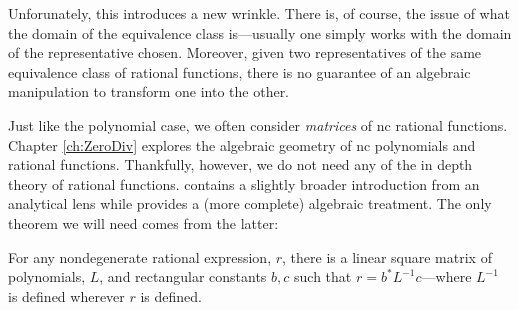 Unforunately, this introduces a new wrinkle. There is, of course, the issue of
what the domain of the equivalence class is---usually one simply works with the
domain of the representative chosen. Moreover, given two representatives of the
same equivalence class of rational functions, there is no guarantee of an
algebraic manipulation to transform one into the other.

Just like the polynomial case, we often consider \emph{matrices} of nc rational
functions. Chapter \ref{ch:ZeroDiv} explores the algebraic geometry of nc
polynomials and rational functions. Thankfully, however, we do not
need any of the in depth theory of rational functions. \cite{heltonFree2013}
contains a slightly broader introduction from an analytical lens while \cite{cohnFree2006}
provides a (more complete) algebraic treatment. The only theorem we will need
comes from the latter:

\begin{theorem}
\label{thm:ratchar}
  For any nondegenerate
  rational expression, \(r\), there is a linear square matrix of polynomials, \(L\), and
  rectangular constants \(b,c\) such that \(r=b^*L ^{-1}c\)---where \(L ^{-1}\) is
  defined wherever \(r\) is defined.
\end{theorem}
